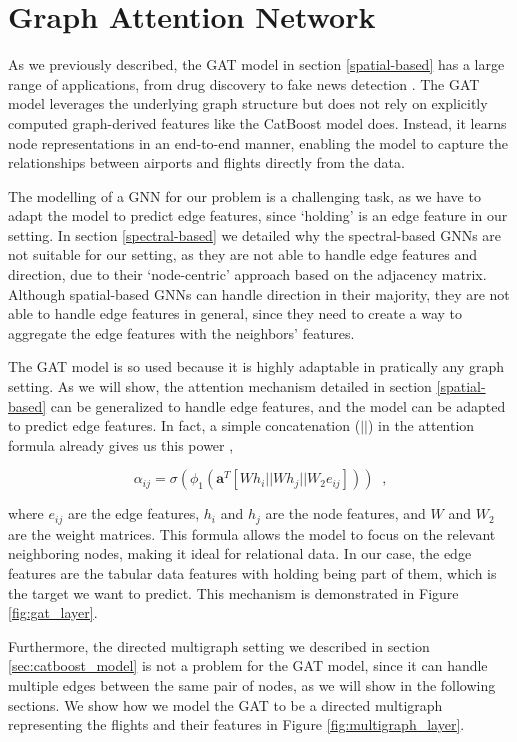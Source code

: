 \section[Graph Attention Network]{Graph Attention Network}
\label{Graph Attention Network}

As we previously described, the GAT model in section \ref{spatial-based} has a large range of applications, from drug discovery to fake news detection \cite{keywordsCaravanti}. The GAT model leverages the underlying graph structure but does not rely on explicitly computed graph-derived features like the CatBoost model does. Instead, it learns node representations in an end-to-end manner, enabling the model to capture the relationships between airports and flights directly from the data.

The modelling of a GNN for our problem is a challenging task, as we have to adapt the model to predict edge features, since `holding' is an edge feature in our setting. In section \ref{spectral-based} we detailed why the spectral-based GNNs are not suitable for our setting, as they are not able to handle edge features and direction, due to their `node-centric' approach based on the adjacency matrix. Although spatial-based GNNs can handle direction in their majority, they are not able to handle edge features in general, since they need to create a way to aggregate the edge features with the neighbors' features.

The GAT model is so used because it is highly adaptable in pratically any graph setting. As we will show, the attention mechanism detailed in section \ref{spatial-based} can be generalized to handle edge features, and the model can be adapted to predict edge features. In fact, a simple concatenation ($ || $) in the attention formula already gives us this power
,

$$ \alpha_{ij} = \sigma(\phi_1( \mathbf{a}^T [ W h_i || W h_j || W_2 e_{ij} ])) \; \; \text{,}$$
  
  where $e_{ij}$ are the edge features, $h_i$ and $h_j$ are the node features, and $W$ and $W_2$ are the weight matrices. This formula allows the model to focus on the relevant neighboring nodes, making it ideal for relational data. In our case, the edge features are the tabular data features with holding being part of them, which is the target we want to predict. This mechanism is demonstrated in Figure \ref{fig:gat_layer}.




Furthermore, the directed multigraph setting we described in section \ref{sec:catboost_model} is not a problem for the GAT model, since it can handle multiple edges between the same pair of nodes, as we will show in the following sections. We show how we model the GAT to be a directed multigraph representing the flights and their features in Figure \ref{fig:multigraph_layer}.


